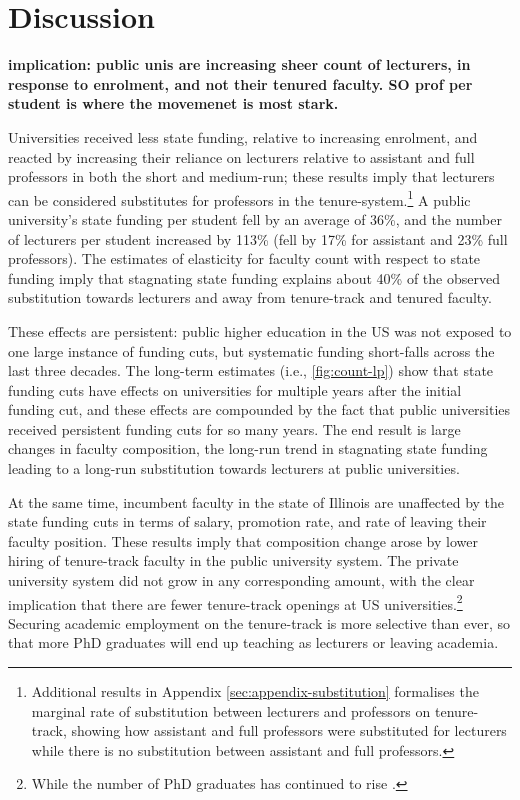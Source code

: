 \section{Discussion}
\label{sec:discussion}

\textbf{implication: public unis are increasing sheer count of lecturers, in response to enrolment, and not their tenured faculty.
SO prof per student is where the movemenet is most stark.}

Universities received less state funding, relative to increasing enrolment, and reacted by increasing their reliance on lecturers relative to assistant and full professors in both the short and medium-run; these results imply that lecturers can be considered substitutes for professors in the tenure-system.\footnote{
    Additional results in Appendix \autoref{sec:appendix-substitution} formalises the marginal rate of substitution between lecturers and professors on tenure-track, showing how assistant and full professors were substituted for lecturers while there is no substitution between assistant and full professors.
}
A public university's state funding per student fell by an average of 36\%, and the number of lecturers per student increased by 113\% (fell by 17\% for assistant and 23\% full professors).
The estimates of elasticity for faculty count with respect to state funding imply that stagnating state funding explains about 40\% of the observed substitution towards lecturers and away from tenure-track and tenured faculty.

These effects are persistent: public higher education in the US was not exposed to one large instance of funding cuts, but systematic funding short-falls across the last three decades.
The long-term estimates (i.e., \autoref{fig:count-lp}) show that state funding cuts have effects on universities for multiple years after the initial funding cut, and these effects are compounded by the fact that public universities received persistent funding cuts for so many years.
The end result is large changes in faculty composition, the long-run trend in stagnating state funding leading to a long-run substitution towards lecturers at public universities.

At the same time, incumbent faculty in the state of Illinois are unaffected by the state funding cuts in terms of salary, promotion rate, and rate of leaving their faculty position.
These results imply that composition change arose by lower hiring of tenure-track faculty in the public university system.
The private university system did not grow in any corresponding amount, with the clear implication that there are fewer tenure-track openings at US universities.\footnote{
    While the number of PhD graduates has continued to rise \citep{aau2021survey}.
}
Securing academic employment on the tenure-track is more selective than ever, so that more PhD graduates will end up teaching as lecturers or leaving academia.

